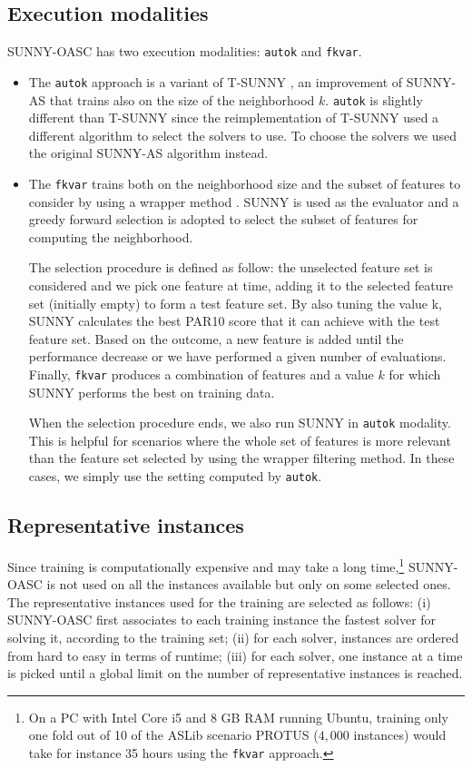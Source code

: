 \documentclass[tablecaption=bottom,wcp]{jmlr} %
\begin{document}
\subsection{Execution modalities}

SUNNY-OASC has two execution modalities: \texttt{autok} and 
\texttt{fkvar}.

\begin{itemize}
\item The \texttt{autok} approach is a variant of T-SUNNY \citep{DBLP:conf/lion/LindauerBH16}, 
an improvement of SUNNY-AS that trains also on the size of the neighborhood 
$k$. \texttt{autok} is slightly different than T-SUNNY since the 
reimplementation of T-SUNNY used a different algorithm to select the 
solvers to use. To choose the solvers we used the original SUNNY-AS 
algorithm instead.

\item The \texttt{fkvar} trains both on the neighborhood size and 
the subset of features to consider by using a wrapper method 
\citep{Kohavi97wrappersfor}. SUNNY is used as the evaluator and a 
greedy forward selection is adopted to select the subset of features for 
computing the neighborhood.

The selection procedure is defined as follow: 
the unselected feature set is considered and we pick one feature at time, 
adding it to the selected feature set (initially empty) to form a test 
feature set. By also tuning the value k, SUNNY calculates the best PAR10 score 
that it can achieve with the test feature set. Based on the outcome, a new 
feature is added until the performance decrease or we have performed a given 
number of evaluations. Finally, \texttt{fkvar} 
produces a combination of features and a value $k$ for which SUNNY performs the 
best on training data.

When the selection procedure ends, we also run SUNNY in %
\texttt{autok} modality. This is helpful
for scenarios where the whole set of features is more relevant than the 
feature set selected by using the wrapper filtering method. 
In these cases, we simply use the setting computed by \texttt{autok}.
\end{itemize}
 

\subsection{Representative instances}
Since training is computationally expensive and may take a long time,\footnote{On a PC 
with Intel Core i5 and 8 GB RAM running Ubuntu, 
training only one fold out of 10 of the ASLib scenario PROTUS ($4,000$ 
instances) would take for instance 35 hours using the \texttt{fkvar} approach.} 
SUNNY-OASC is not used on all the instances available but only on some selected 
ones.
The representative instances used for the training are selected as follows: (i) 
SUNNY-OASC first associates to each training instance the fastest solver for solving 
it, according to the training set; (ii) for each solver, instances are 
ordered from hard to easy in terms of runtime;
(iii) for each solver, one instance at a time is picked until a 
global limit on the number of representative instances is reached.
\end{document}
